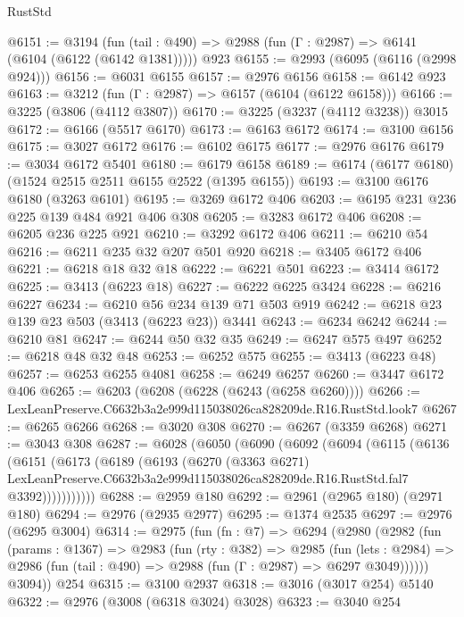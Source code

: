 \begin{lexlean}{RustStd}
\begin{coremodule}
@6151 := @3194
    (fun (tail : @490) => @2988 (fun (Γ : @2987) => @6141 (@6104 (@6122 (@6142 @1381)))))
    @923
@6155 := @2993 (@6095 (@6116 (@2998 @924)))
@6156 := @6031 @6155
@6157 := @2976 @6156
@6158 := @6142 @923
@6163 := @3212 (fun (Γ : @2987) => @6157 (@6104 (@6122 @6158)))
@6166 := @3225 (@3806 (@4112 @3807))
@6170 := @3225 (@3237 (@4112 @3238)) @3015
@6172 := @6166 (@5517 @6170)
@6173 := @6163 @6172
@6174 := @3100 @6156
@6175 := @3027 @6172
@6176 := @6102 @6175
@6177 := @2976 @6176
@6179 := @3034 @6172 @5401
@6180 := @6179 @6158
@6189 := @6174 (@6177 @6180) (@1524 @2515 @2511 @6155 @2522 (@1395 @6155))
@6193 := @3100 @6176 @6180 (@3263 @6101)
@6195 := @3269 @6172 @406
@6203 := @6195 @231 @236 @225 @139 @484 @921 @406 @308
@6205 := @3283 @6172 @406
@6208 := @6205 @236 @225 @921
@6210 := @3292 @6172 @406
@6211 := @6210 @54
@6216 := @6211 @235 @32 @207 @501 @920
@6218 := @3405 @6172 @406
@6221 := @6218 @18 @32 @18
@6222 := @6221 @501
@6223 := @3414 @6172
@6225 := @3413 (@6223 @18)
@6227 := @6222 @6225 @3424
@6228 := @6216 @6227
@6234 := @6210 @56 @234 @139 @71 @503 @919
@6242 := @6218 @23 @139 @23 @503 (@3413 (@6223 @23)) @3441
@6243 := @6234 @6242
@6244 := @6210 @81
@6247 := @6244 @50 @32 @35
@6249 := @6247 @575 @497
@6252 := @6218 @48 @32 @48
@6253 := @6252 @575
@6255 := @3413 (@6223 @48)
@6257 := @6253 @6255 @4081
@6258 := @6249 @6257
@6260 := @3447 @6172 @406
@6265 := @6203 (@6208 (@6228 (@6243 (@6258 @6260))))
@6266 := LexLeanPreserve.C6632b3a2e999d115038026ca828209de.R16.RustStd.look7
@6267 := @6265 @6266
@6268 := @3020 @308
@6270 := @6267 (@3359 @6268)
@6271 := @3043 @308
@6287 := @6028
    (@6050
      (@6090
        (@6092
          (@6094
            (@6115
              (@6136
                (@6151
                  (@6173
                    (@6189
                      (@6193
                        (@6270
                          (@3363 @6271)
                          LexLeanPreserve.C6632b3a2e999d115038026ca828209de.R16.RustStd.fal7
                          @3392)))))))))))
@6288 := @2959 @180
@6292 := @2961 (@2965 @180) (@2971 @180)
@6294 := @2976 (@2935 @2977)
@6295 := @1374 @2535
@6297 := @2976 (@6295 @3004)
@6314 := @2975
    (fun (fn : @7) =>
    @6294
      (@2980
        (@2982
          (fun (params : @1367) =>
          @2983
            (fun (rty : @382) =>
            @2985
              (fun (lets : @2984) =>
              @2986 (fun (tail : @490) => @2988 (fun (Γ : @2987) => @6297 @3049))))))
        @3094))
    @254
@6315 := @3100 @2937
@6318 := @3016 (@3017 @254) @5140
@6322 := @2976 (@3008 (@6318 @3024) @3028)
@6323 := @3040 @254

\end{coremodule}
\end{lexlean}
